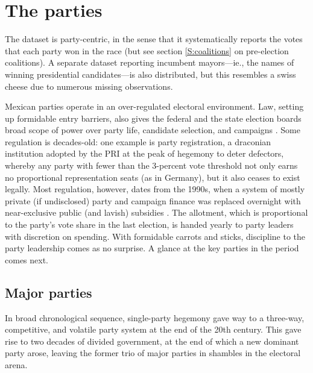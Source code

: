 \documentclass[letter,12pt]{article}
\begin{document}
\section{The parties}

The dataset is party-centric, in the sense that it systematically reports the votes that each party won in the race (but see section \ref{S:coalitions} on pre-election coalitions). A separate dataset reporting incumbent mayors---ie., the names of winning presidential candidates---is also distributed, but this resembles a swiss cheese due to numerous missing observations. 

Mexican parties operate in an over-regulated electoral environment. Law, setting up formidable entry barriers, also gives the federal and the state election boards broad scope of power over party life, candidate selection, and campaigns \citep{estevez.ref2007.2007}. Some regulation is decades-old: one example is party registration, a draconian institution adopted by the PRI at the peak of hegemony to deter defectors, whereby any party with fewer than the 3-percent vote threshold not only earns no proportional representation seats (as in Germany), but it also ceases to exist legally. Most regulation, however, dates from the 1990s, when a system of mostly private (if undisclosed) party and campaign finance was replaced overnight with near-exclusive public (and lavish) subsidies \citep{poire.Money2005}. The allotment, which is proportional to the party's vote share in the last election, is handed yearly to party leaders with discretion on spending. With formidable carrots and sticks, discipline to the party leadership comes as no surprise. A glance at the key parties in the period comes next.

\subsection{Major parties}

In broad chronological sequence, single-party hegemony gave way to a three-way, competitive, and volatile party system at the end of the 20th century. This gave rise to two decades of divided government, at the end of which a new dominant party arose, leaving the former trio of major parties in shambles in the electoral arena.
\end{document}
